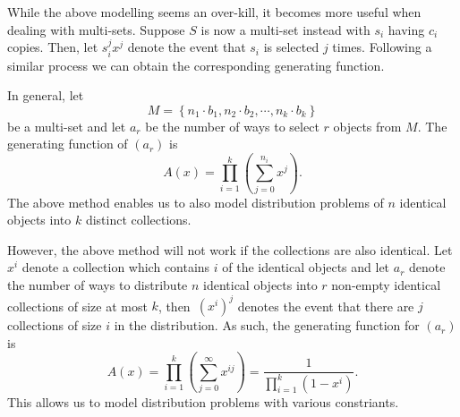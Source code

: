\documentclass[math]{amznotes}
\theoremstyle{remark}
\newcommand{\0}{\mathbf{0}}
\newcommand{\1}{\mathbf{1}}
\begin{document}
While the above modelling seems an over-kill, it becomes more useful when dealing with multi-sets. Suppose $S$ is now a multi-set instead with $s_i$ having $c_i$ copies. Then, let $s_i^jx^j$ denote the event that $s_i$ is selected $j$ times. Following a similar process we can obtain the corresponding generating function.

In general, let 
\begin{equation*}
    M = \left\{n_1 \cdot b_1, n_2 \cdot b_2, \cdots, n_k \cdot b_k\right\}
\end{equation*}
be a multi-set and let $a_r$ be the number of ways to select $r$ objects from $M$. The generating function of $(a_r)$ is
\begin{equation*}
    A(x) = \prod_{i = 1}^{k}\left(\sum_{j = 0}^{n_i}x^j\right).
\end{equation*}
The above method enables us to also model distribution problems of $n$ identical objects into $k$ distinct collections. 

However, the above method will not work if the collections are also identical. Let $x^i$ denote a collection which contains $i$ of the identical objects and let $a_r$ denote the number of ways to distribute $n$ identical objects into $r$ non-empty identical collections of size at most $k$, then~$\left(x^i\right)^j$ denotes the event that there are $j$ collections of size $i$ in the distribution. As such, the generating function for $(a_r)$ is
\begin{equation*}
    A(x) = \prod_{i = 1}^{k}\left(\sum_{j = 0}^{\infty}x^{ij}\right) = \frac{1}{\prod_{i = 1}^{k}(1 - x^i)}.
\end{equation*}
This allows us to model distribution problems with various constriants.
\end{document}
